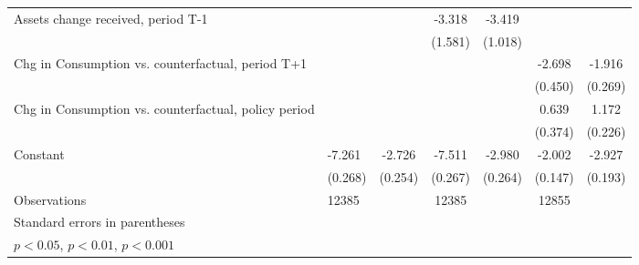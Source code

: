 \begin{table}[htbp]
\begin{tabular}{p{0.8in}l*{5}{c}}
Assets change received, period T-1&                     &                     &      -3.318\sym{*}  &      -3.419\sym{***}&                     &                     \\
                    &                     &                     &     (1.581)         &     (1.018)         &                     &                     \\
Chg in Consumption vs. counterfactual, period T+1&                     &                     &                     &                     &      -2.698\sym{***}&      -1.916\sym{***}\\
                    &                     &                     &                     &                     &     (0.450)         &     (0.269)         \\
Chg in Consumption vs. counterfactual, policy period&                     &                     &                     &                     &       0.639         &       1.172\sym{***}\\
                    &                     &                     &                     &                     &     (0.374)         &     (0.226)         \\
Constant            &      -7.261\sym{***}&      -2.726\sym{***}&      -7.511\sym{***}&      -2.980\sym{***}&      -2.002\sym{***}&      -2.927\sym{***}\\
                    &     (0.268)         &     (0.254)         &     (0.267)         &     (0.264)         &     (0.147)         &     (0.193)         \\
\hline
Observations        &       12385         &                     &       12385         &                     &       12855         &                     \\
\hline\hline
\multicolumn{7}{l}{\footnotesize Standard errors in parentheses}\\
\multicolumn{7}{l}{\footnotesize \sym{*} \(p<0.05\), \sym{**} \(p<0.01\), \sym{***} \(p<0.001\)}\\
\end{tabular}
\end{table}
